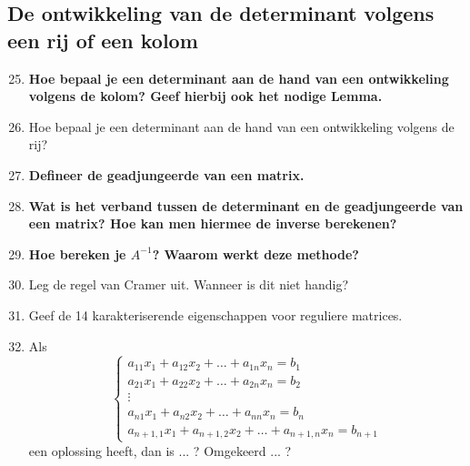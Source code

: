 \documentclass[12pt]{article}
\begin{document}
    \subsection{De ontwikkeling van de determinant volgens een rij of een kolom}
    \begin{enumerate}
        \setcounter{enumi}{24}
        \item \textbf{Hoe bepaal je een determinant aan de hand van een ontwikkeling volgens de kolom? Geef hierbij ook het nodige Lemma.}
        \item Hoe bepaal je een determinant aan de hand van een ontwikkeling volgens de rij?
        \item \textbf{Defineer de geadjungeerde van een matrix.}
        \item \textbf{Wat is het verband tussen de determinant en de geadjungeerde van een matrix? Hoe kan men hiermee de inverse berekenen?}
        \item \textbf{Hoe bereken je $A^{-1}$? Waarom werkt deze methode?}
        \item Leg de regel van Cramer uit. Wanneer is dit niet handig?
        \item Geef de 14 karakteriserende eigenschappen voor reguliere matrices.
        \item Als \begin{equation}
            \begin{cases} 
                a_{11}x_1+a_{12}x_2+\dots + a_{1n}x_n = b_1 \\ 
                a_{21}x_1+a_{22}x_2+\dots + a_{2n}x_n = b_2 \\ 
                \vdots \\
                a_{n1}x_1+a_{n2}x_2+\dots + a_{nn}x_n = b_n \\
                a_{n+1,1}x_1+a_{n+1,2}x_2+\dots+ a_{n+1,n}x_n = b_{n+1} 
            \end{cases}
            \end{equation}
            een oplossing heeft, dan is ... ? Omgekeerd ... ?
    \end{enumerate}
\end{document}
